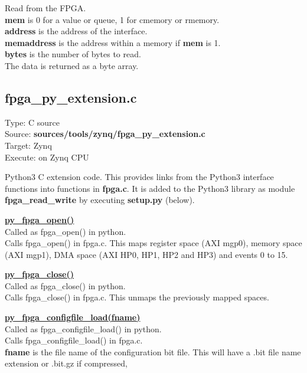                 Read from the FPGA.\\
                {\bf mem} is 0 for a value or queue, 1 for cmemory or rmemory.\\
                {\bf address} is the address of the interface.\\
                {\bf memaddress} is the address within a memory if {\bf mem} is 1.\\
                {\bf bytes} is the number of bytes to read.\\
                The data is returned as a byte array.

        \subsection{fpga\_py\_extension.c}

            Type: C source\\        
            Source: {\bf sources/tools/zynq/fpga\_py\_extension.c}\\
            Target: Zynq\\
            Execute: on Zynq CPU

            Python3 C extension code. This provides links from the Python3 interface functions
            into functions in {\bf fpga.c}. It is added to the Python3 library as module
            {\bf fpga\_read\_write} by executing {\bf setup.py} (below).


            \underline{{\bf py\_fpga\_open()}} \\

                Called as fpga\_open() in python.\\
                Calls fpga\_open() in fpga.c.
                This maps register space (AXI mgp0), memory space (AXI mgp1), DMA space (AXI HP0, HP1, HP2 and
                HP3) and events 0 to 15.

            \underline{{\bf py\_fpga\_close()}} \\

                Called as fpga\_close() in python.\\
                Calls fpga\_close() in fpga.c.
                This unmaps the previously mapped spaces.

            \underline{{\bf py\_fpga\_configfile\_load(fname)}} \\

                Called as fpga\_configfile\_load() in python.\\
                Calls fpga\_configfile\_load() in fpga.c.\\
                {\bf fname} is the file name of the configuration bit file. This will have a .bit
                file name extension or .bit.gz if compressed,

